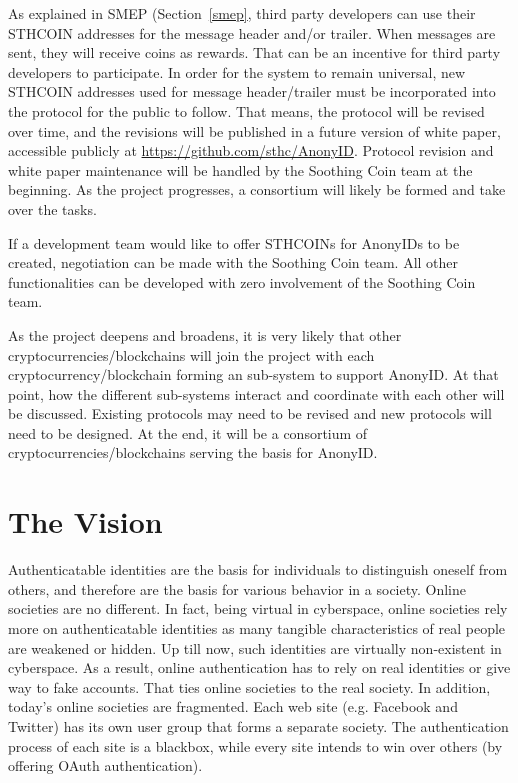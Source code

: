 \documentclass[12pt, a4paper]{article}
\begin{document}
As explained in SMEP (Section~\ref{smep}, third party developers can use their STHCOIN addresses for the message header and/or trailer. When messages are sent, they will receive coins as rewards. That can be an incentive for third party developers to participate. In order for the system to remain universal, new STHCOIN addresses used for message header/trailer must be incorporated into the protocol for the public to follow. That means, the protocol will be revised over time, and the revisions will be published in a future version of white paper, accessible publicly at \href{https://github.com/sthc/AnonyID}{https://github.com/sthc/AnonyID}. Protocol revision and white paper maintenance will be handled by the Soothing Coin team at the beginning. As the project progresses, a consortium will likely be formed and take over the tasks.

If a development team would like to offer STHCOINs for AnonyIDs to be created, negotiation can be made with the Soothing Coin team. 
All other functionalities can be developed with zero involvement of the Soothing Coin team.

As the project deepens and broadens, it is very likely that other cryptocurrencies/blockchains will join the project with each cryptocurrency/blockchain forming an sub-system to support AnonyID. At that point, how the different sub-systems interact and coordinate with each other will be discussed. Existing protocols may need to be revised and new protocols will need to be designed. At the end, it will be a consortium of cryptocurrencies/blockchains serving the basis for AnonyID.


\section{The Vision}

Authenticatable identities are the basis for individuals to distinguish oneself from others, and therefore are the basis for various behavior in a society. Online societies are no different. In fact, being virtual in cyberspace, online societies rely more on authenticatable identities as many tangible characteristics of real people are weakened or hidden. Up till now, such identities are virtually non-existent in cyberspace. As a result, online authentication has to rely on real identities or give way to fake accounts. That ties online societies to the real society. In addition, today's online societies are fragmented. Each web site (e.g. Facebook and Twitter) has its own user group that forms a separate society. The authentication process of each site is a blackbox, while every site intends to win over others (by offering OAuth authentication). 
\end{document}
